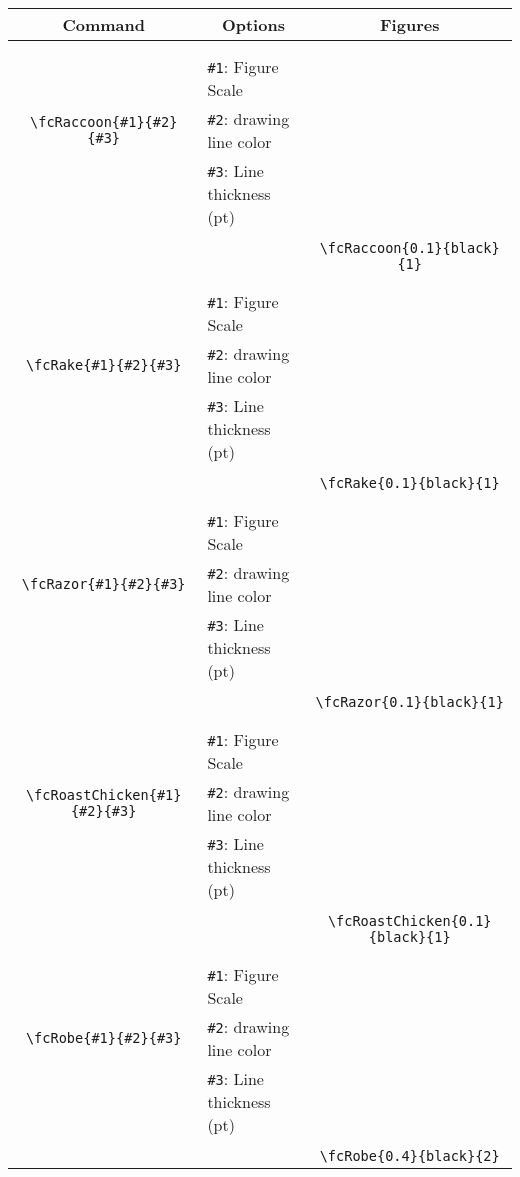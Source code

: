 \documentclass[x11names]{article}
\begin{document}
\begin{table}[H]\centering\begin{tabular}{|c|l|c|}\hline {\bf Command}& \multicolumn{1}{c|}{{\bf Options}} & {\bf Figures}\\  \hline	&&\multirow{5}{*}{\fcRaccoon{0.1}{black}{1}}\\	&&\\	&\verb|#1|: Figure Scale &\\	\verb|\fcRaccoon{#1}{#2}{#3}|&	\verb|#2|: drawing line color &\\	&\verb|#3|: Line thickness (pt) &\\ &&\\&&	\verb|\fcRaccoon{0.1}{black}{1}|\\\hline 	
	&&\multirow{5}{*}{\fcRake{0.1}{black}{1}}\\	&&\\	&\verb|#1|: Figure Scale &\\	\verb|\fcRake{#1}{#2}{#3}|&	\verb|#2|: drawing line color &\\	&\verb|#3|: Line thickness (pt) &\\ &&\\&&	\verb|\fcRake{0.1}{black}{1}|\\\hline 	
	&&\multirow{5}{*}{\fcRazor{0.1}{black}{1}}\\	&&\\	&\verb|#1|: Figure Scale &\\	\verb|\fcRazor{#1}{#2}{#3}|&	\verb|#2|: drawing line color &\\	&\verb|#3|: Line thickness (pt) &\\ &&\\&&	\verb|\fcRazor{0.1}{black}{1}|\\\hline 	
	&&\multirow{5}{*}{\fcRoastChicken{0.1}{black}{1}}\\	&&\\	&\verb|#1|: Figure Scale &\\	\verb|\fcRoastChicken{#1}{#2}{#3}|&	\verb|#2|: drawing line color &\\	&\verb|#3|: Line thickness (pt) &\\ &&\\&&	\verb|\fcRoastChicken{0.1}{black}{1}|\\\hline 	
	&&\multirow{5}{*}{\fcRobe{0.4}{black}{2}}\\	&&\\	&\verb|#1|: Figure Scale &\\	\verb|\fcRobe{#1}{#2}{#3}|&	\verb|#2|: drawing line color &\\	&\verb|#3|: Line thickness (pt) &\\ &&\\&&	\verb|\fcRobe{0.4}{black}{2}|\\\hline 	

\end{tabular}
\end{table}
\end{document}
